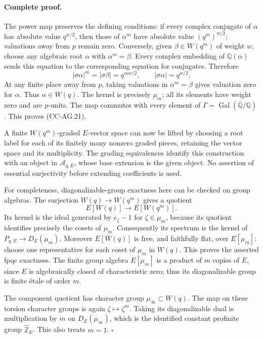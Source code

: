 \paragraph{Complete proof.}
The power map preserves the defining conditions: if every complex
conjugate of \(\alpha\) has absolute value \(q^{w/2}\), then those
of \(\alpha^m\) have absolute value \((q^m)^{w/2}\); valuations
away from \(p\) remain zero.  Conversely, given
\(\beta\in W(q^m)\) of weight \(w\), choose any algebraic root
\(\alpha\) with \(\alpha^m=\beta\).  Every complex embedding of
\(\mathbb Q(\alpha)\) sends this equation to the corresponding
equation for conjugates.  Therefore
\[
        |\sigma\alpha|^m=|\sigma\beta|=q^{mw/2},
        \qquad |\sigma\alpha|=q^{w/2}.
\]
At any finite place away from \(p\), taking valuations in
\(\alpha^m=\beta\) gives valuation zero for \(\alpha\).
Thus \(\alpha\in W(q)\).  The kernel is precisely \(\mu_m\);
all its elements have weight zero and are \(p\)-units.  The map
commutes with every element of
\(\Gamma=\operatorname{Gal}(\overline{\mathbb Q}/\mathbb Q)\).
This proves (CC-AG.21).

A finite \(W(q^m)\)-graded \(E\)-vector space can now be lifted by
choosing a root label for each of its finitely many nonzero
graded pieces, retaining the vector space and its multiplicity.
The grading equivalences identify this construction with an
object in \(\mathcal A_{q,E}\), whose base extension is the given
object.  No assertion of essential surjectivity before extending
coefficients is used.

For completeness, diagonalizable-group exactness here can be
checked on group algebras.  The surjection \(W(q)\to W(q^m)\)
gives a quotient
\[
       E[W(q)]\longrightarrow E[W(q^m)].
\]
Its kernel is the ideal generated by \(e_\zeta-1\) for
\(\zeta\in\mu_m\), because its quotient identifies precisely
the cosets of \(\mu_m\).  Consequently its spectrum is the
kernel of \(P_{q,E}\to D_E(\mu_m)\).  Moreover
\(E[W(q)]\) is free, and faithfully flat, over \(E[\mu_m]\):
choose one representative for each coset of \(\mu_m\) in
\(W(q)\).  This proves the asserted fpqc exactness.
The finite group algebra \(E[\mu_m]\) is a product of \(m\)
copies of \(E\), since \(E\) is algebraically closed of
characteristic zero; thus its diagonalizable group is finite
\'{e}tale of order \(m\).

The component quotient has character group
\(\mu_\infty\subset W(q)\).  The map on these torsion
character groups is again \(\zeta\mapsto\zeta^m\).
Taking its diagonalizable dual is multiplication by \(m\)
on \(D_E(\mu_\infty)\), which is the identified constant
profinite group \(\widehat{\mathbb Z}_E\).
This also treats \(m=1\). \(\square\)

